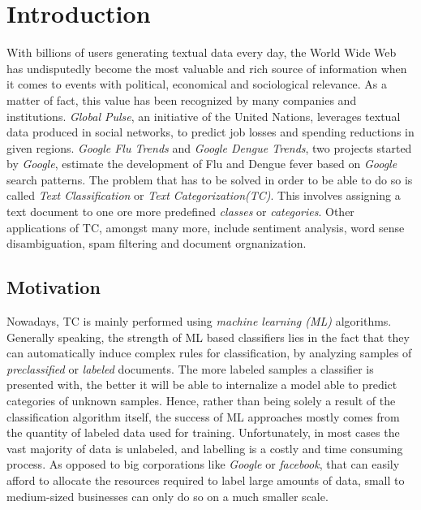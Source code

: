 
\chapter{Introduction}
\label{ch:Introduction}

With billions of users generating textual data every day, the World
Wide Web has undisputedly become the most valuable and rich source
of information when it comes to events with political, economical and
sociological relevance. As a matter of fact, this value has been recognized by
many companies and institutions. \emph{Global Pulse}, an initiative of the United
Nations, leverages textual data produced in social networks, to predict job
losses and spending reductions in given regions. \emph{Google Flu
Trends} and \emph{Google Dengue Trends}, two projects started by \emph{Google},
estimate the development of Flu and Dengue fever based on \emph{Google} search
patterns. The problem that has to be solved in order to be able to do so is
called \emph{Text Classification} or \emph{Text Categorization(TC)}. This involves
assigning a text document to one ore more predefined \emph{classes} or \emph{categories}. 
Other applications of TC, amongst many more, include sentiment analysis, word
sense disambiguation, spam filtering and document orgnanization. 

\section{Motivation}
\label{sec:Motivation}
Nowadays, TC is mainly performed using \emph{machine learning (ML)} algorithms.
Generally speaking, the strength of ML based classifiers lies in the fact
that they can automatically induce complex rules for classification, by
analyzing samples of \textit{preclassified} or \textit{labeled} documents. 
The more labeled samples a classifier is presented with, the better it will be
able to internalize a model able to predict categories of unknown samples. 
Hence, rather than being solely a result of the classification algorithm itself,
the success of ML approaches mostly comes from the quantity of labeled
data used for training. Unfortunately, in most cases the vast majority of
data is unlabeled, and labelling is a costly and time consuming process. 
As opposed to big corporations like \emph{Google} or \emph{facebook}, that can
easily afford to allocate the resources required to label large amounts of data, 
small to medium-sized businesses can only do so on a much smaller scale. 

